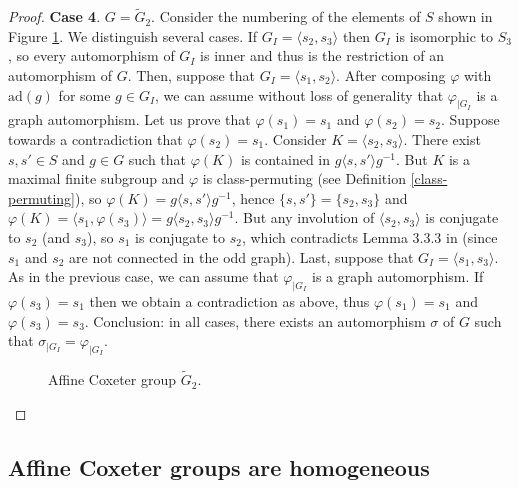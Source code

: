 \documentclass[a4paper, 11pt]{amsart}
\theoremstyle{definition}
\theoremstyle{remark}
\begin{document}
\begin{proof}
\medskip
\noindent \textbf{Case 4}. $G=\tilde{G}_2$. 
\newline Consider the numbering of the elements of $S$ shown in Figure \ref{G2}. We distinguish several cases. If $G_I=\langle s_2,s_3\rangle$ then $G_I$ is isomorphic to $S_3$, so every automorphism of $G_I$ is inner and thus is the restriction of an automorphism of $G$. Then, suppose that $G_I=\langle s_1,s_2\rangle$. After composing $\varphi$ with $\mathrm{ad}(g)$ for some $g\in G_I$, we can assume without loss of generality that $\varphi_{\vert G_I}$ is a graph automorphism. Let us prove that $\varphi(s_1)=s_1$ and $\varphi(s_2)=s_2$. Suppose towards a contradiction that $\varphi(s_2)=s_1$. Consider $K=\langle s_2,s_3\rangle$. There exist $s,s'\in S$ and $g\in G$ such that $\varphi(K)$ is contained in $g\langle s,s'\rangle g^{-1}$. But $K$ is a maximal finite subgroup and $\varphi$ is class-permuting (see Definition \ref{class-permuting}), so $\varphi(K)=g\langle s,s'\rangle g^{-1}$, hence $\lbrace s,s'\rbrace=\lbrace s_2,s_3\rbrace$ and $\varphi(K)=\langle s_1,\varphi(s_3)\rangle=g\langle s_2,s_3\rangle g^{-1}$. But any involution of $\langle s_2,s_3\rangle$ is conjugate to $s_2$ (and $s_3$), so $s_1$ is conjugate to $s_2$, which contradicts Lemma 3.3.3 in \cite{davis} (since $s_1$ and $s_2$ are not connected in the odd graph). Last, suppose that $G_I=\langle s_1,s_3\rangle$. As in the previous case, we can assume that $\varphi_{\vert G_I}$ is a graph automorphism. If $\varphi(s_3)=s_1$ then we obtain a contradiction as above, thus $\varphi(s_1)=s_1$ and $\varphi(s_3)=s_3$. Conclusion: in all cases, there exists an automorphism $\sigma$ of $G$ such that $\sigma_{\vert G_I}=\varphi_{\vert G_I}$.

\begin{figure}[h!]
  \centering
  \caption{Affine Coxeter group $\tilde{G}_2$.}
  \label{G2}
\end{figure}
\end{proof}

\subsection{Affine Coxeter groups are homogeneous}\label{details3}
\end{document}

